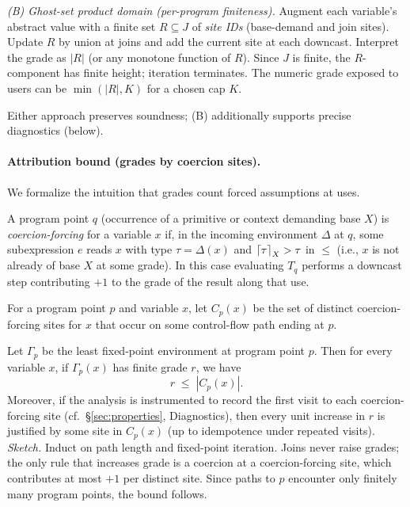 \smallskip
\noindent\emph{(B) Ghost-set product domain (per-program finiteness).}
Augment each variable’s abstract value with a finite set $R\subseteq J$ of \emph{site IDs} (base-demand and join sites).
Update $R$ by union at joins and add the current site at each downcast.
Interpret the grade as $|R|$ (or any monotone function of $R$).
Since $J$ is finite, the $R$-component has finite height; iteration terminates.
The numeric grade exposed to users can be $\min(|R|,K)$ for a chosen cap $K$.

\smallskip
Either approach preserves soundness; (B) additionally supports precise diagnostics (below).

\paragraph{Attribution bound (grades by coercion sites).}
We formalize the intuition that grades count forced assumptions at uses.

\begin{definition}
A program point $q$ (occurrence of a primitive or context demanding base $X$) is \emph{coercion-forcing} for a variable $x$ if, in the incoming environment $\Delta$ at $q$, some subexpression $e$ reads $x$ with type $\tau=\Delta(x)$ and $\left\lceil \tau \right\rceil_X > \tau$ in $\le$ (i.e., $x$ is not already of base $X$ at some grade).
In this case evaluating $T_q$ performs a downcast step contributing $+1$ to the grade of the result along that use.
\end{definition}

\begin{definition}
For a program point $p$ and variable $x$, let $C_p(x)$ be the set of distinct coercion-forcing sites for $x$ that occur on some control-flow path ending at $p$.
\end{definition}

\begin{theorem}
\label{thm:attribution}
Let $\Gamma_p$ be the least fixed-point environment at program point $p$.
Then for every variable $x$, if $\Gamma_p(x)$ has finite grade $r$, we have
\[
r \;\le\; |C_p(x)|.
\]
Moreover, if the analysis is instrumented to record the first visit to each coercion-forcing site (cf.\ §\ref{sec:properties}, Diagnostics), then every unit increase in $r$ is justified by some site in $C_p(x)$ (up to idempotence under repeated visits).
\emph{Sketch.} Induct on path length and fixed-point iteration.
Joins never raise grades; the only rule that increases grade is a coercion at a coercion-forcing site, which contributes at most $+1$ per distinct site.
Since paths to $p$ encounter only finitely many program points, the bound follows.
\end{theorem}

